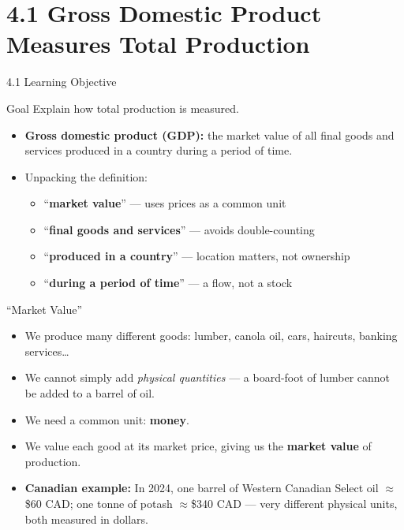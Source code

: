 \documentclass[aspectratio=169]{beamer}
\begin{document}
\section{4.1 Gross Domestic Product Measures Total Production}

\begin{frame}{4.1 Learning Objective}
\transfade
\begin{block}{Goal}
Explain how total production is measured.
\end{block}
\begin{itemize}[<+->]
  \item \textbf{Gross domestic product (GDP):} the market value of all final goods and services produced in a country during a period of time.
  \item Unpacking the definition:
  \begin{itemize}[<+->]
    \item ``\textbf{market value}'' --- uses prices as a common unit
    \item ``\textbf{final goods and services}'' --- avoids double-counting
    \item ``\textbf{produced in a country}'' --- location matters, not ownership
    \item ``\textbf{during a period of time}'' --- a flow, not a stock
  \end{itemize}
\end{itemize}
\end{frame}

\begin{frame}{``Market Value''}
\transfade
\begin{itemize}[<+->]
  \item We produce many different goods: lumber, canola oil, cars, haircuts, banking services\ldots
  \item We cannot simply add \emph{physical quantities} --- a board-foot of lumber cannot be added to a barrel of oil.
  \item We need a \alert{common unit}: \textbf{money}.
  \item We value each good at its \alert{market price}, giving us the \textbf{market value} of production.
  \item \textbf{Canadian example:} In 2024, one barrel of Western Canadian Select oil $\approx$\$60 CAD; one tonne of potash $\approx$\$340 CAD --- very different physical units, both measured in dollars.
\end{itemize}
\end{frame}
\end{document}
